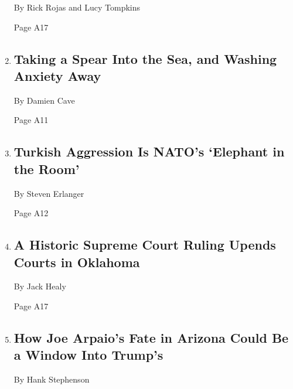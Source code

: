 \begin{enumerate}
  By Rick Rojas and Lucy Tompkins

  Page A17
\item
  \href{/2020/08/03/world/australia/spearfishing-sydney-coronavirus.html}{}

  \hypertarget{taking-a-spear-into-the-sea-and-washing-anxiety-away}{%
  \subsection{Taking a Spear Into the Sea, and Washing Anxiety
  Away}\label{taking-a-spear-into-the-sea-and-washing-anxiety-away}}

  By Damien Cave

  Page A11
\item
  \href{/2020/08/03/world/europe/turkey-nato.html}{}

  \hypertarget{turkish-aggression-is-natos-elephant-in-the-room}{%
  \subsection{Turkish Aggression Is NATO's `Elephant in the
  Room'}\label{turkish-aggression-is-natos-elephant-in-the-room}}

  By Steven Erlanger

  Page A12
\item
  \href{/2020/08/03/us/Supreme-court-Oklahoma-tribal-land-ruling.html}{}

  \hypertarget{a-historic-supreme-court-ruling-upends-courts-in-oklahoma}{%
  \subsection{A Historic Supreme Court Ruling Upends Courts in
  Oklahoma}\label{a-historic-supreme-court-ruling-upends-courts-in-oklahoma}}

  By Jack Healy

  Page A17
\item
  \href{/2020/08/02/us/politics/arizona-election-joe-arpaio.html}{}

  \hypertarget{how-joe-arpaios-fate-in-arizona-could-be-a-window-into-trumps}{%
  \subsection{How Joe Arpaio's Fate in Arizona Could Be a Window Into
  Trump's}\label{how-joe-arpaios-fate-in-arizona-could-be-a-window-into-trumps}}

  By Hank Stephenson


\end{enumerate}
